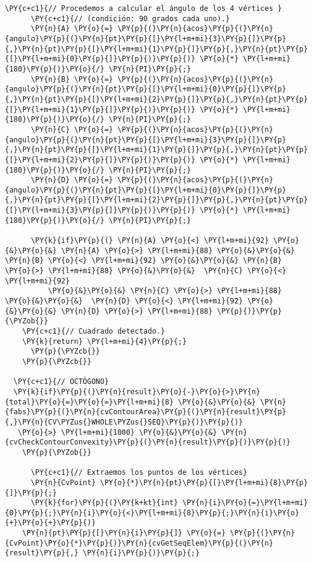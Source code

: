 \begin{Verbatim}[commandchars=\\\{\}]
      \PY{c+c1}{// Procedemos a calcular el ángulo de los 4 vértices }
      \PY{c+c1}{// (condición: 90 grados cada uno).}
      \PY{n}{A} \PY{o}{=} \PY{p}{(}\PY{n}{acos}\PY{p}{(}\PY{n}{angulo}\PY{p}{(}\PY{n}{pt}\PY{p}{[}\PY{l+m+mi}{3}\PY{p}{]}\PY{p}{,}\PY{n}{pt}\PY{p}{[}\PY{l+m+mi}{1}\PY{p}{]}\PY{p}{,}\PY{n}{pt}\PY{p}{[}\PY{l+m+mi}{0}\PY{p}{]}\PY{p}{)}\PY{p}{)} \PY{o}{*} \PY{l+m+mi}{180}\PY{p}{)}\PY{o}{/} \PY{n}{PI}\PY{p}{;} 
      \PY{n}{B} \PY{o}{=} \PY{p}{(}\PY{n}{acos}\PY{p}{(}\PY{n}{angulo}\PY{p}{(}\PY{n}{pt}\PY{p}{[}\PY{l+m+mi}{0}\PY{p}{]}\PY{p}{,}\PY{n}{pt}\PY{p}{[}\PY{l+m+mi}{2}\PY{p}{]}\PY{p}{,}\PY{n}{pt}\PY{p}{[}\PY{l+m+mi}{1}\PY{p}{]}\PY{p}{)}\PY{p}{)} \PY{o}{*} \PY{l+m+mi}{180}\PY{p}{)}\PY{o}{/} \PY{n}{PI}\PY{p}{;}
      \PY{n}{C} \PY{o}{=} \PY{p}{(}\PY{n}{acos}\PY{p}{(}\PY{n}{angulo}\PY{p}{(}\PY{n}{pt}\PY{p}{[}\PY{l+m+mi}{3}\PY{p}{]}\PY{p}{,}\PY{n}{pt}\PY{p}{[}\PY{l+m+mi}{1}\PY{p}{]}\PY{p}{,}\PY{n}{pt}\PY{p}{[}\PY{l+m+mi}{2}\PY{p}{]}\PY{p}{)}\PY{p}{)} \PY{o}{*} \PY{l+m+mi}{180}\PY{p}{)}\PY{o}{/} \PY{n}{PI}\PY{p}{;} 
      \PY{n}{D} \PY{o}{=} \PY{p}{(}\PY{n}{acos}\PY{p}{(}\PY{n}{angulo}\PY{p}{(}\PY{n}{pt}\PY{p}{[}\PY{l+m+mi}{0}\PY{p}{]}\PY{p}{,}\PY{n}{pt}\PY{p}{[}\PY{l+m+mi}{2}\PY{p}{]}\PY{p}{,}\PY{n}{pt}\PY{p}{[}\PY{l+m+mi}{3}\PY{p}{]}\PY{p}{)}\PY{p}{)} \PY{o}{*} \PY{l+m+mi}{180}\PY{p}{)}\PY{o}{/} \PY{n}{PI}\PY{p}{;}

      \PY{k}{if}\PY{p}{(} \PY{n}{A} \PY{o}{<} \PY{l+m+mi}{92} \PY{o}{&}\PY{o}{&} \PY{n}{A} \PY{o}{>} \PY{l+m+mi}{88} \PY{o}{&}\PY{o}{&} \PY{n}{B} \PY{o}{<} \PY{l+m+mi}{92} \PY{o}{&}\PY{o}{&} \PY{n}{B} \PY{o}{>} \PY{l+m+mi}{88} \PY{o}{&}\PY{o}{&}  \PY{n}{C} \PY{o}{<} \PY{l+m+mi}{92} 
          \PY{o}{&}\PY{o}{&} \PY{n}{C} \PY{o}{>} \PY{l+m+mi}{88} \PY{o}{&}\PY{o}{&}  \PY{n}{D} \PY{o}{<} \PY{l+m+mi}{92} \PY{o}{&}\PY{o}{&} \PY{n}{D} \PY{o}{>} \PY{l+m+mi}{88} \PY{p}{)}\PY{p}{\PYZob{}} 
	\PY{c+c1}{// Cuadrado detectado.}
	\PY{k}{return} \PY{l+m+mi}{4}\PY{p}{;}
      \PY{p}{\PYZcb{}}
    \PY{p}{\PYZcb{}}

  \PY{c+c1}{// OCTÓGONO}
  \PY{k}{if}\PY{p}{(}\PY{n}{result}\PY{o}{-}\PY{o}{>}\PY{n}{total}\PY{o}{=}\PY{o}{=}\PY{l+m+mi}{8} \PY{o}{&}\PY{o}{&} \PY{n}{fabs}\PY{p}{(}\PY{n}{cvContourArea}\PY{p}{(}\PY{n}{result}\PY{p}{,}\PY{n}{CV\PYZus{}WHOLE\PYZus{}SEQ}\PY{p}{)}\PY{p}{)}
   \PY{o}{>} \PY{l+m+mi}{1000} \PY{o}{&}\PY{o}{&} \PY{n}{cvCheckContourConvexity}\PY{p}{(}\PY{n}{result}\PY{p}{)}\PY{p}{)} 
    \PY{p}{\PYZob{}}

      \PY{c+c1}{// Extraemos los puntos de los vértices}
      \PY{n}{CvPoint} \PY{o}{*}\PY{n}{pt}\PY{p}{[}\PY{l+m+mi}{8}\PY{p}{]}\PY{p}{;}
      \PY{k}{for}\PY{p}{(}\PY{k+kt}{int} \PY{n}{i}\PY{o}{=}\PY{l+m+mi}{0}\PY{p}{;}\PY{n}{i}\PY{o}{<}\PY{l+m+mi}{8}\PY{p}{;}\PY{n}{i}\PY{o}{+}\PY{o}{+}\PY{p}{)}
	\PY{n}{pt}\PY{p}{[}\PY{n}{i}\PY{p}{]} \PY{o}{=} \PY{p}{(}\PY{n}{CvPoint}\PY{o}{*}\PY{p}{)}\PY{n}{cvGetSeqElem}\PY{p}{(}\PY{n}{result}\PY{p}{,} \PY{n}{i}\PY{p}{)}\PY{p}{;}


\end{Verbatim}
